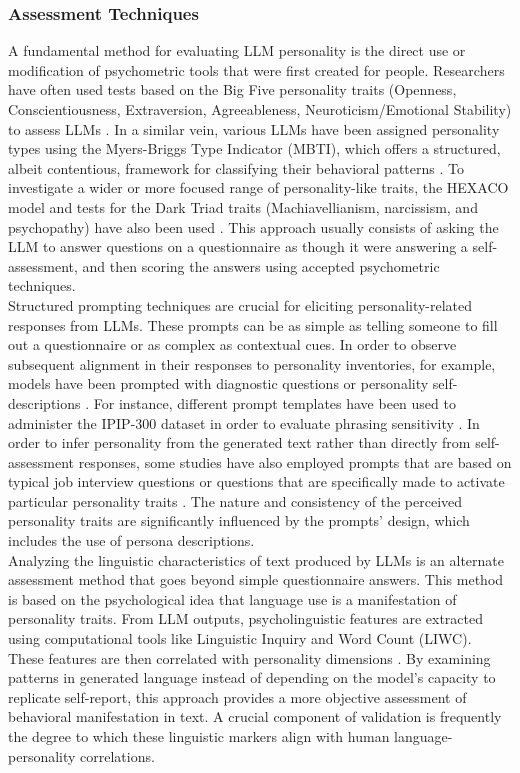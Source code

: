 \documentclass{DESSThesis}
\begin{document}
\subsubsection{Assessment Techniques}
A fundamental method for evaluating LLM personality is the direct use or modification of psychometric tools that were first created for people. Researchers have often used tests based on the Big Five personality traits (Openness, Conscientiousness, Extraversion, Agreeableness, Neuroticism/Emotional Stability) to assess LLMs \cite{caron_manipulating_2023,jiang_personallm_2024,safdari_personality_2023,sorokovikova_llms_2024,suhr_challenging_2023,tommaso_llms_2024}. In a similar vein, various LLMs have been assigned personality types using the Myers-Briggs Type Indicator (MBTI), which offers a structured, albeit contentious, framework for classifying their behavioral patterns \cite{pan_llms_2023}. To investigate a wider or more focused range of personality-like traits, the HEXACO model and tests for the Dark Triad traits (Machiavellianism, narcissism, and psychopathy) have also been used \cite{allbert_identifying_2025,bodroza_personality_2024,lee_llms_2024}. This approach usually consists of asking the LLM to answer questions on a questionnaire as though it were answering a self-assessment, and then scoring the answers using accepted psychometric techniques.
\\
Structured prompting techniques are crucial for eliciting personality-related responses from LLMs. These prompts can be as simple as telling someone to fill out a questionnaire or as complex as contextual cues. In order to observe subsequent alignment in their responses to personality inventories, for example, models have been prompted with diagnostic questions or personality self-descriptions \cite{caron_manipulating_2023,safdari_personality_2023}. For instance, different prompt templates have been used to administer the IPIP-300 dataset in order to evaluate phrasing sensitivity \cite{gupta_self-assessment_2024}. In order to infer personality from the generated text rather than directly from self-assessment responses, some studies have also employed prompts that are based on typical job interview questions or questions that are specifically made to activate particular personality traits \cite{hilliard_eliciting_2024}. The nature and consistency of the perceived personality traits are significantly influenced by the prompts' design, which includes the use of persona descriptions.
\\
Analyzing the linguistic characteristics of text produced by LLMs is an alternate assessment method that goes beyond simple questionnaire answers. This method is based on the psychological idea that language use is a manifestation of personality traits. From LLM outputs, psycholinguistic features are extracted using computational tools like Linguistic Inquiry and Word Count (LIWC). These features are then correlated with personality dimensions \cite{jiang_personallm_2024}. By examining patterns in generated language instead of depending on the model's capacity to replicate self-report, this approach provides a more objective assessment of behavioral manifestation in text. A crucial component of validation is frequently the degree to which these linguistic markers align with human language-personality correlations.
\end{document}
